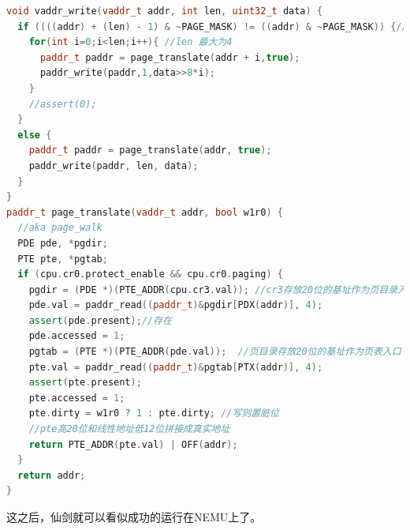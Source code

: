 \documentclass[UTF8,a4paper,10pt]{ctexart}
\begin{document}
{\begin{lstlisting}[title=分页机制,frame=trbl,language={C++}]
void vaddr_write(vaddr_t addr, int len, uint32_t data) {
  if ((((addr) + (len) - 1) & ~PAGE_MASK) != ((addr) & ~PAGE_MASK)) {//data cross the page boundary
    for(int i=0;i<len;i++){ //len 最大为4
      paddr_t paddr = page_translate(addr + i,true);
      paddr_write(paddr,1,data>>8*i);
    }
    //assert(0);
  } 
  else {
    paddr_t paddr = page_translate(addr, true);
    paddr_write(paddr, len, data);
  }
}
paddr_t page_translate(vaddr_t addr, bool w1r0) {
  //aka page_walk
  PDE pde, *pgdir;
  PTE pte, *pgtab;
  if (cpu.cr0.protect_enable && cpu.cr0.paging) {
    pgdir = (PDE *)(PTE_ADDR(cpu.cr3.val)); //cr3存放20位的基址作为页目录入口
    pde.val = paddr_read((paddr_t)&pgdir[PDX(addr)], 4);
    assert(pde.present);//存在
    pde.accessed = 1;
    pgtab = (PTE *)(PTE_ADDR(pde.val));  //页目录存放20位的基址作为页表入口
    pte.val = paddr_read((paddr_t)&pgtab[PTX(addr)], 4);
    assert(pte.present);
    pte.accessed = 1;
    pte.dirty = w1r0 ? 1 : pte.dirty; //写则置脏位
    //pte高20位和线性地址低12位拼接成真实地址
    return PTE_ADDR(pte.val) | OFF(addr); 
  }
  return addr;
}
  \end{lstlisting}

  这之后，仙剑就可以看似成功的运行在NEMU上了。
}
\end{document}
